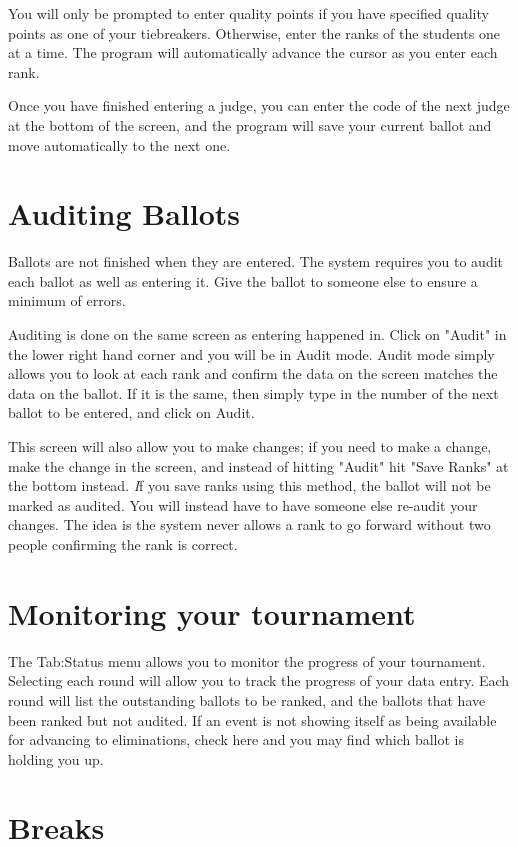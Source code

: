 \documentclass[12pt]{report} \usepackage {fullpage} \usepackage{times}
\begin{document}
You will only be prompted to enter quality points if you have specified
quality points as one of your tiebreakers.  Otherwise, enter the ranks of
the students one at a time.  The program will automatically advance the
cursor as you enter each rank.

Once you have finished entering a judge, you can enter the code of the next
judge at the bottom of the screen, and the program will save your current
ballot and move automatically to the next one.

\section{Auditing Ballots}

Ballots are not finished when they are entered.   The system requires you
to audit each ballot as well as entering it.  Give the ballot to someone
else to ensure a minimum of errors.

Auditing is done on the same screen as entering happened in.   Click on
"Audit" in the lower right hand corner and you will be in Audit mode.
Audit mode simply allows you to look at each rank and confirm the data on
the screen matches the data on the ballot.  If it is the same, then simply
type in the number of the next ballot to be entered, and click on Audit.   

This screen will also allow you to make changes; if you need to make a
change, make the change in the screen, and instead of hitting "Audit" hit
"Save Ranks" at the bottom instead.   {\emph If you save ranks using this
method, the ballot will not be marked as audited}.  You will instead have
to have someone else re-audit your changes.  The idea is the system never
allows a rank to go forward without two people confirming the rank is
correct.

\section{Monitoring your tournament}

The Tab:Status menu allows you to monitor the progress of your tournament.
Selecting each round will allow you to track the progress of your data
entry.   Each round will list the outstanding ballots to be ranked, and the
ballots that have been ranked but not audited.  If an event is not showing
itself as being available for advancing to eliminations, check here and you
may find which ballot is holding you up.

\section{Breaks}
\end{document}
